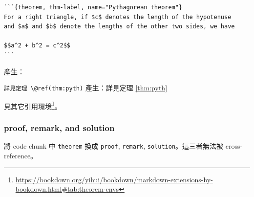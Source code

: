 \documentclass[oneside]{book}
\renewcommand{\href}[2]{#2\footnote{\url{#1}}}
\theoremstyle{definition}
\theoremstyle{definition}
\theoremstyle{definition}
\theoremstyle{remark}
\begin{document}
\begin{verbatim}
```{theorem, thm-label, name="Pythagorean theorem"}
For a right triangle, if $c$ denotes the length of the hypotenuse
and $a$ and $b$ denote the lengths of the other two sides, we have

$$a^2 + b^2 = c^2$$
```
\end{verbatim}

產生：

\texttt{詳見定理\ \textbackslash{}@ref(thm:pyth)} 產生：詳見定理
\ref{thm:pyth}

見其它\href{https://bookdown.org/yihui/bookdown/markdown-extensions-by-bookdown.html\#tab:theorem-envs}{引用環境}。

\subsubsection{proof, remark, and
solution}\label{proof-remark-and-solution}

將 code chunk 中 \texttt{theorem} 換成 \texttt{proof}, \texttt{remark},
\texttt{solution}。這三者無法被 cross-reference。
\end{document}
